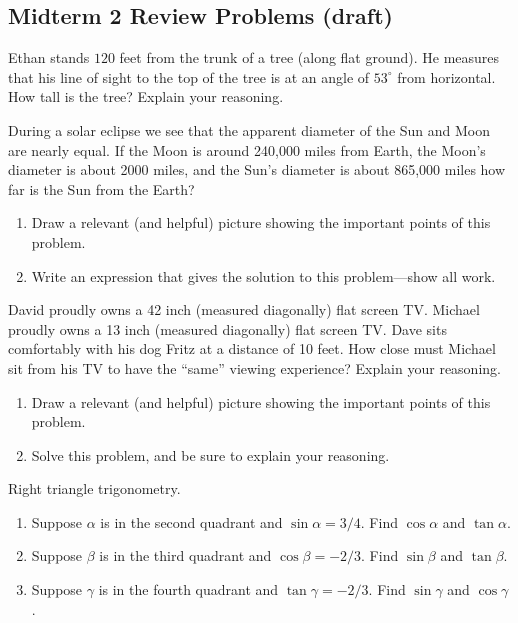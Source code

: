 \subsection{Midterm 2 Review Problems (draft)}

\begin{prob}
Ethan stands $120$ feet from the trunk of a tree (along flat ground).  He measures that his line of sight to the top of the tree is at an angle of $53^\circ$ from horizontal.  How tall is the tree?  Explain your reasoning.  
\end{prob}

\begin{prob}
During a solar eclipse we see that the apparent diameter of the Sun and Moon are nearly equal. If the Moon is around 240,000 miles from Earth, the Moon's diameter is about 2000 miles, and the Sun's diameter is about 865,000 miles how far is the Sun from the Earth?
\begin{enumerate}
\item Draw a relevant (and helpful) picture showing the important points of this problem.
\item Write an expression that gives the solution to this problem---show all work.
\end{enumerate}
\end{prob}

\begin{prob}
David proudly owns a 42 inch (measured diagonally) flat screen
  TV. Michael proudly owns a 13 inch (measured diagonally) flat screen
  TV. Dave sits comfortably with his dog Fritz at a distance of 10
  feet. How close must Michael sit from his TV to have the ``same''
  viewing experience?  Explain your reasoning.
\begin{enumerate}
\item Draw a relevant (and helpful) picture showing the important
  points of this problem.
\item Solve this problem, and be sure to explain your reasoning.
\end{enumerate}
\end{prob}

\begin{prob}
Right triangle trigonometry.  
\begin{enumerate}
\item Suppose $\alpha$ is in the second quadrant and $\sin\alpha = 3/4$.  Find $\cos\alpha$ and $\tan\alpha$.
\item Suppose $\beta$ is in the third quadrant and $\cos\beta = -2/3$.  Find $\sin\beta$ and $\tan\beta$.
\item Suppose $\gamma$ is in the fourth quadrant and $\tan\gamma = -2/3$.  Find $\sin\gamma$ and $\cos\gamma$.
\end{enumerate}
\end{prob}

